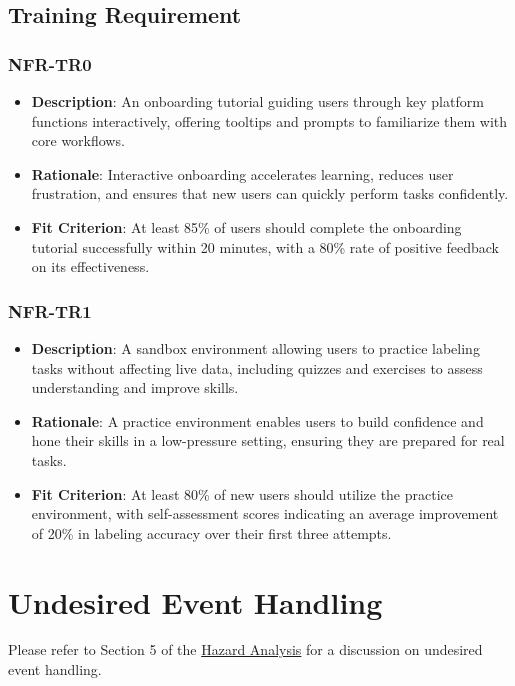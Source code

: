 \documentclass[12pt]{article}
\begin{document}
\subsection{Training Requirement}


\subsubsection*{NFR-TR0}
        \label{sec:TR0}
        \begin{itemize} 
            \item \textbf{Description}: An onboarding tutorial guiding users through key platform functions interactively, offering tooltips and prompts to familiarize them with core workflows.  
            \item \textbf{Rationale}: Interactive onboarding accelerates learning, reduces user frustration, and ensures that new users can quickly perform tasks confidently.  
            \item \textbf{Fit Criterion}: At least 85\% of users should complete the onboarding tutorial successfully within 20 minutes, with a 80\% rate of positive feedback on its effectiveness.
        \end{itemize}
        \subsubsection*{NFR-TR1}
        \label{sec:TR1}
        \begin{itemize} 
            \item \textbf{Description}: A sandbox environment allowing users to practice labeling tasks without affecting live data, including quizzes and exercises to assess understanding and improve skills.  
            \item \textbf{Rationale}: A practice environment enables users to build confidence and hone their skills in a low-pressure setting, ensuring they are prepared for real tasks.  
            \item \textbf{Fit Criterion}: At least 80\% of new users should utilize the practice environment, with self-assessment scores indicating an average improvement of 20\% in labeling accuracy over their first three attempts.
        \end{itemize}


\section{Undesired Event Handling}
Please refer to Section 5 of the \href{https://github.com/OKKM-insights/OKKM.insights/blob/main/docs/HazardAnalysis/HazardAnalysis.pdf}{Hazard Analysis} for a discussion on undesired event handling.
\end{document}
